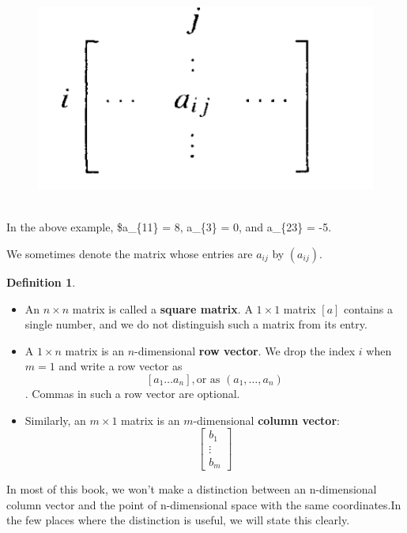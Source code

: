 \documentclass[
]{book}
\theoremstyle{definition}
\newtheorem{definition}{Definition}[chapter]
\theoremstyle{definition}
\theoremstyle{definition}
\theoremstyle{definition}
\theoremstyle{remark}
\begin{document}
\begin{figure}
\centering
\includegraphics{figures/ch_1/fig02.png}
\caption{\label{fig:fig02}\(~\)}
\end{figure}

In the above example, \$a\_\{11\} = 8, a\_\{3\} = 0, and a\_\{23\} = -5.

We sometimes denote the matrix whose entries are \(a_{ij}\) by \((a_{ij})\).

\begin{definition}
\protect\hypertarget{def:unnamed-chunk-2}{}\label{def:unnamed-chunk-2}\leavevmode

\begin{itemize}
\item
  An \(n \times n\) matrix is called a \textbf{square matrix}. A \(1 \times 1\) matrix \([a]\) contains a single number, and we do not distinguish such a matrix from its entry.
\item
  A \(1 \times n\) matrix is an \(n\)-dimensional \textbf{row vector}. We drop the index \(i\) when \(m = 1\) and write a row vector as \[[a_1 \ldots a_n], \text{or as }(a_1,\ldots, a_n)\]. Commas in such a row vector are optional.
\item
  Similarly, an \(m \times 1\) matrix is an \(m\)-dimensional \textbf{column vector}:
  \[
  \begin{bmatrix}
  b_1 \\
  \vdots \\
  b_m
  \end{bmatrix}
  \]
\end{itemize}

\end{definition}

In most of this book, we won't make a distinction between an n-dimensional column vector
and the point of n-dimensional space with the same coordinates.In the few places where the distinction is useful, we will state this clearly.
\end{document}
